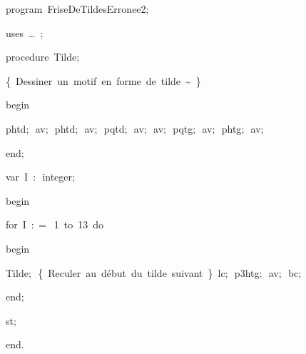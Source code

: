 
{
\parindent {}
\medskip

\carrenoir
\vspace{\neglskip}\mbox{\blc  \idt  \mcl program\idt \ FriseDeTildesErronee2$;$
}\par 
\vspace{\neglskip}\mbox{\blc \blk\idt \mcl uses\idt \ \ldots\ $;$
}\par 
\medskip

\pagebreak[3] 
\vspace{\neglskip}\mbox{\blc  \blk\idt  \mcl procedure\idt \ Tilde$;$}\par 
\vspace{\neglskip}\mbox{\blc  \blk\blk\idt  \cmt  \{\ Dessiner\ un\ motif\ en\ forme\ de\ tilde\ \~{ }\ \}\idt }\par 
\vspace{\neglskip}\mbox{\blc  \blk\idt  \mcl begin\idt }\par 
\vspace{\neglskip}\mbox{\blc  \blk\blk\idt  phtd$;$\ av$;$\ phtd$;$\ av$;$\ pqtd$;$\ av$;$\ av$;$\ pqtg$;$\ av$;$\ phtg$;$\ av$;$}\par 
\vspace{\neglskip}\mbox{\blc  \blk\idt  \mcl end\idt $;$}\par 
\medskip

\pagebreak[3] 
\vspace{\neglskip}\mbox{\blc  \blk\idt  \mcl var\idt \ I\ $:$\ integer$;$}\par 
\medskip

\vspace{\neglskip}\mbox{\blc  \idt  \mcl begin\idt }\par 
\pagebreak[3] 
\vspace{\neglskip}\mbox{\blc  \blk\idt  \mcl for\idt \ I\ $:$$=$\ 1\ \mcl to\idt \ 13\ \mcl do\idt }\par 
\vspace{\neglskip}\mbox{\blc  \blk\blk\idt  \mcl begin\idt }\par 
\vspace{\neglskip}\mbox{\blc  \blk\blk\blk\idt  Tilde$;$\ \cmt  \{\ Reculer\ au\ début\ du\ tilde\ suivant\ \}\idt \ lc$;$\ p3htg$;$\ av$;$\ bc$;$}\par 
\vspace{\neglskip}\mbox{\blc  \blk\blk\idt  \mcl end\idt $;$}\par 
\vspace{\neglskip}\mbox{\blc  \blk\idt  st$;$}\par 
\vspace{\neglskip}\mbox{\blc  \idt  \mcl end\idt $.$}\par 

\medskip }

